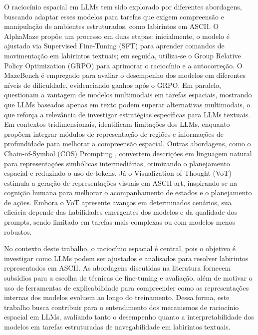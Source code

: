 O raciocínio espacial em LLMs tem sido explorado por diferentes abordagens, buscando adaptar esses modelos para tarefas que exigem compreensão e manipulação de ambientes estruturados, como labirintos em ASCII. O AlphaMaze \cite{dao2025alphamaze} propõe um processo em duas etapas: inicialmente, o modelo é ajustado via Supervised Fine-Tuning (SFT) para aprender comandos de movimentação em labirintos textuais; em seguida, utiliza-se o Group Relative Policy Optimization (GRPO) para aprimorar o raciocínio e a autocorreção. O MazeBench é empregado para avaliar o desempenho dos modelos em diferentes níveis de dificuldade, evidenciando ganhos após o GRPO. Em paralelo, \cite{jiang2024supervised} questionam a vantagem de modelos multimodais em tarefas espaciais, mostrando que LLMs baseados apenas em texto podem superar alternativas multimodais, o que reforça a relevância de investigar estratégias específicas para LLMs textuais. Em contextos tridimensionais, \cite{zhang2025pointvisiontextpointcloudboost} identificam limitações dos LLMs, enquanto \cite{cheng2024spatialrgpt} propõem integrar módulos de representação de regiões e informações de profundidade para melhorar a compreensão espacial. Outras abordagens, como o Chain-of-Symbol (COS) Prompting \cite{hu2024chainofsymbol}, convertem descrições em linguagem natural para representações simbólicas intermediárias, otimizando o planejamento espacial e reduzindo o uso de tokens. Já o Visualization of Thought (VoT) \cite{wu2024visualizationofthought} estimula a geração de representações visuais em ASCII art, inspirando-se na cognição humana para melhorar o acompanhamento de estados e o planejamento de ações. Embora o VoT apresente avanços em determinados cenários, sua eficácia depende das habilidades emergentes dos modelos e da qualidade dos prompts, sendo limitado em tarefas mais complexas ou com modelos menos robustos.

No contexto deste trabalho, o raciocínio espacial é central, pois o objetivo é investigar como LLMs podem ser ajustados e analisados para resolver labirintos representados em ASCII. As abordagens discutidas na literatura fornecem subsídios para a escolha de técnicas de fine-tuning e avaliação, além de motivar o uso de ferramentas de explicabilidade para compreender como as representações internas dos modelos evoluem ao longo do treinamento. Dessa forma, este trabalho busca contribuir para o entendimento dos mecanismos de raciocínio espacial em LLMs, avaliando tanto o desempenho quanto a interpretabilidade dos modelos em tarefas estruturadas de navegabilidade em labirintos textuais.

